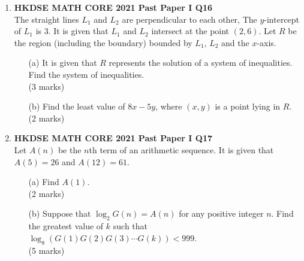 \documentclass[12pt]{article}
\begin{document}
\begin{enumerate}
	\item \textbf{HKDSE MATH CORE 2021 Past Paper I Q16}\\
	The straight lines $L_1$ and $L_2$ are perpendicular to each other, The $y$-intercept of $L_1$ is 3. It is given that $L_1$ and $L_2$ intersect at the point $(2,6)$. Let $R$ be the region (including the boundary) bounded by $L_1$, $L_2$ and the $x$-axis.
	\begin{enumerate}
		\item[(a)] It is given that $R$ represents the solution of a system of inequalities. Find the system of inequalities. \\(3 marks)
		\item[(b)] Find the least value of $8x - 5y$, where $(x,y)$ is a point lying in $R$. \\(2 marks)
	\end{enumerate}

	\item \textbf{HKDSE MATH CORE 2021 Past Paper I Q17}\\
	Let $A(n)$ be the $n$th term of an arithmetic sequence. It is given that $A(5) = 26$ and $A(12) = 61$.
	\begin{enumerate}
		\item[(a)] Find $A(1)$. \\(2 marks)
		\item[(b)] Suppose that $\log_2{G(n)} = A(n)$ for any positive integer $n$. Find the greatest value of $k$ such that $\log_8{\left(G(1)G(2)G(3)\cdots G(k)\right) < 999}$. \\(5 marks)
	\end{enumerate}


\end{enumerate}
\end{document}
